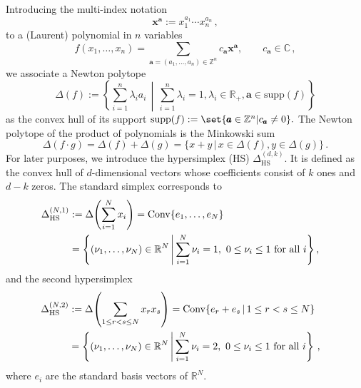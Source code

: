 \documentclass[12pt,a4paper]{article}
\theoremstyle{plain}
\theoremstyle{remark}
\newcommand{\nprops}{N}
\newcommand{\undernotation}[1]{\pmb{#1}}
\newcommand{\Conv}{\operatorname{Conv}}
\newcommand{\Newton}{\Delta}
\DeclareMathOperator{\supp}{supp}
\newcommand{\simplexwithpars}[1]{\Newton_{\text{HS}}^{(#1)}}
\begin{document}
		Introducing the multi-index  notation
		\begin{equation}
			\undernotation x^{\undernotation {a}}:=   x_1^{ a_1}\cdots x_n^{a_n}\, ,
		\end{equation}
		to a  (Laurent) polynomial in $n$ variables
		\begin{equation}\label{e:LaurentDef}
			f(x_1,\dots,x_n)=\sum_{\undernotation a=(a_1,\dots,a_n)\in \mathbb
				Z^n} c_{\undernotation a} \undernotation x^{\undernotation a}, \qquad
			c_{\undernotation a} \in\mathbb C \, ,
		\end{equation}
		we associate a Newton polytope
		\begin{equation}\label{e:DeltaLaurentDef}
			\Newton(f):= \left\{\sum_{i=1}^n\lambda_i a_i \, \middle| \, \sum_{i=1}^n
			\lambda_i=1, \lambda_i\in\mathbb R_+, \undernotation a\in \textrm{supp}(f)\right\} 
		\end{equation}
		as the convex hull of its support
		$
		\supp(f):=\set{\undernotation a\in\mathbb Z^n | c_{\undernotation a}\neq0}.
		$
%                
		The Newton polytope of the product of polynomials is                the Minkowski sum
		\begin{equation}
			\Newton(f\cdot g)=\Newton(f)+\Newton(g)=
                        \{x+y \, | \, x\in \Newton(f), y\in \Newton(g) \} \, .
			\label{Newton-property}
                      \end{equation}
For later purposes, we introduce the hypersimplex (HS) $\simplexwithpars{d,k}$. It is defined as the convex hull of $d$-dimensional vectors whose coefficients consist of $k$ ones and $d-k$ zeros. The standard simplex corresponds to 
  \begin{align}\label{e:standardsimplex-definition}
      \simplexwithpars{\nprops,1} &:= \Newton\!\left(\sum_{i=1}^\nprops x_i\right)
    = \Conv\{e_1, \dots, e_\nprops\}\cr
    &=  \left\{ (\nu_1,\dots,\nu_\nprops) \in \mathbb{R}^\nprops \, \middle| \, \sum_{i=1}^\nprops \nu_i = 1, \ 0\le \nu_i \le 1 \text{ for all } i \right\},
  \end{align}
  and the second hypersimplex
  \begin{align}\label{e:secondhypersymplex-definition}
      \simplexwithpars{\nprops,2} &:= \Newton\!\left(\sum_{1 \le r < s \le \nprops} x_r x_s\right)
    = \Conv\{ e_r + e_s \, | \, 1 \le r < s \le \nprops\}\cr
    &= \left\{ (\nu_1,\dots,\nu_\nprops) \in \mathbb{R}^\nprops \, \middle| \, \sum_{i=1}^\nprops \nu_i = 2, \ 0\le \nu_i \le 1 \text{ for all } i \right\}\, ,
  \end{align}
where \( e_i \) are the standard basis vectors of \( \mathbb{R}^\nprops \).
\end{document}
